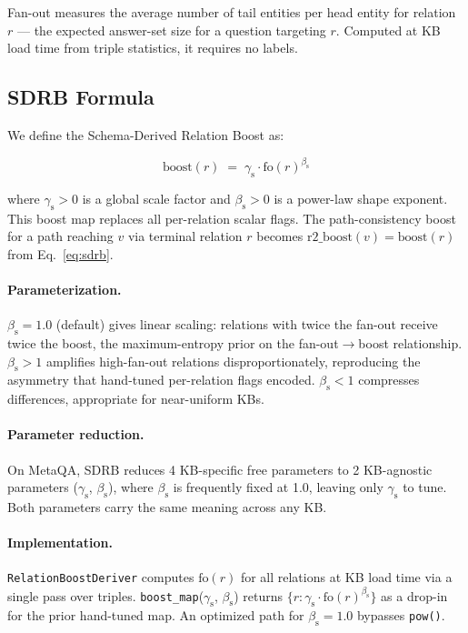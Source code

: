 \documentclass[10pt,twocolumn]{article}
\newcommand{\gS}{\gamma_{\mathrm{s}}}   %
\newcommand{\bS}{\beta_{\mathrm{s}}}    %
\newcommand{\fo}[1]{\mathrm{fo}(#1)}    %
\newcommand{\SDRB}{\textsc{SDRB}}
\begin{document}
Fan-out measures the average number of tail entities per head entity for relation
$r$ --- the expected answer-set size for a question targeting $r$.
Computed at KB load time from triple statistics, it requires no labels.

\subsection{SDRB Formula}
We define the Schema-Derived Relation Boost as:

\begin{equation}
  \mathrm{boost}(r) \;=\; \gS \cdot \fo{r}^{\bS}
  \label{eq:sdrb}
\end{equation}

\noindent where $\gS > 0$ is a global scale factor and $\bS > 0$ is a
power-law shape exponent. This boost map replaces all per-relation scalar flags.
The path-consistency boost for a path reaching $v$ via terminal relation $r$
becomes $\mathrm{r2\_boost}(v) = \mathrm{boost}(r)$ from Eq.~\ref{eq:sdrb}.

\paragraph{Parameterization.}
$\bS = 1.0$ (default) gives linear scaling: relations with twice the fan-out
receive twice the boost, the maximum-entropy prior on the fan-out$\to$boost
relationship. $\bS > 1$ amplifies high-fan-out relations disproportionately,
reproducing the asymmetry that hand-tuned per-relation flags encoded. $\bS < 1$
compresses differences, appropriate for near-uniform KBs.

\paragraph{Parameter reduction.}
On MetaQA, \SDRB{} reduces 4 KB-specific free parameters to 2 KB-agnostic
parameters ($\gS$, $\bS$), where $\bS$ is frequently fixed at 1.0, leaving
only $\gS$ to tune. Both parameters carry the same meaning across any KB.

\paragraph{Implementation.}
\texttt{RelationBoostDeriver} computes $\fo{r}$ for all relations at
KB load time via a single pass over triples.
\texttt{boost\_map}($\gS$, $\bS$) returns $\{r: \gS \cdot \fo{r}^{\bS}\}$
as a drop-in for the prior hand-tuned map.
An optimized path for $\bS = 1.0$ bypasses \texttt{pow()}.
\end{document}
